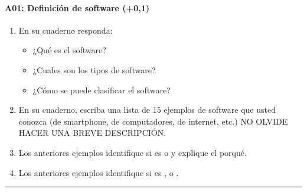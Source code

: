 \documentclass[letterpaper,10pt,spanish]{sphinxmanual}
\begin{document}
\paragraph{A01: Definición de software (+0,1)}
\label{\detokenize{cursos/ofimatica10/periodo01/G02:a01-definicion-de-software-0-1}}
\sphinxAtStartPar
{}
\begin{enumerate}
%
\item {} 
\sphinxAtStartPar
En su cuaderno responda:
\begin{itemize}
\item {} 
\sphinxAtStartPar
¿Qué es el software?

\item {} 
\sphinxAtStartPar
¿Cuales son los tipos de software?

\item {} 
\sphinxAtStartPar
¿Cómo se puede clasificar el software?

\end{itemize}

\item {} 
\sphinxAtStartPar
En su cuaderno, escriba una lista de 15 ejemplos de software que usted conozca (de smartphone, de computadores, de internet, etc.) NO OLVIDE HACER UNA BREVE DESCRIPCIÓN.

\item {} 
\sphinxAtStartPar
Los anteriores ejemplos identifique si es  o  y explique el porqué.

\item {} 
\sphinxAtStartPar
Los anteriores ejemplos identifique si es ,  o .

\end{enumerate}


\bigskip\hrule\bigskip
\end{document}
